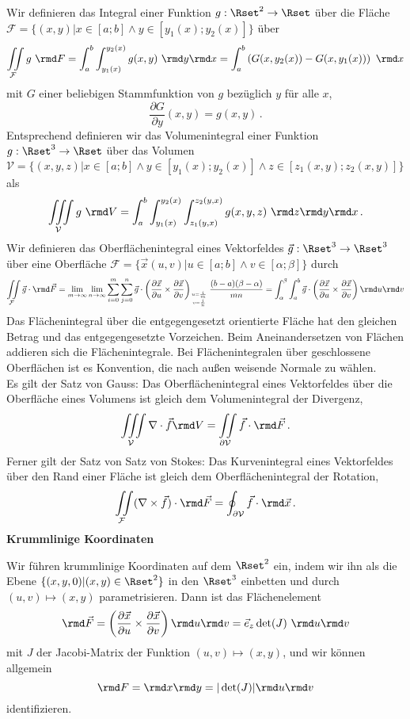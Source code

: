 \documentclass[a4paper,10pt]{article}
\begin{document}
Wir definieren das Integral einer Funktion $g:\Rset^2\to\Rset$ über die
Fläche\\ $\mathcal{F}=\{(x,y)|x\in[a;b]\wedge y\in[y_1(x);y_2(x)]\}$ über
\[
\iint\limits_{\mathcal{F}} g~\rmd F = \int_a^b\int_{y_1(x)}^{y_2(x)}g(x,y)~\rmd y\rmd x
= \int_a^b\left(G(x,y_2(x))-G(x,y_1(x))\right)~\rmd x
\]
mit $G$ einer beliebigen Stammfunktion von $g$ bezüglich $y$ für alle $x$,
\[
\frac{\partial G}{\partial y}(x,y)=g(x,y)\,.
\]
Entsprechend definieren wir das Volumenintegral einer Funktion
$g:\Rset^3\to\Rset$ über das Volumen
$\mathcal{V}=\{(x,y,z)|x\in[a;b]\wedge y\in[y_1(x);y_2(x)]\wedge z\in[z_1(x,y);z_2(x,y)]\}$ als
\[
\iiint\limits_{\mathcal{V}} g~\rmd V = \int_a^b\int_{y_1(x)}^{y_2(x)}\int_{z_1(y,x)}^{z_2(y,x)}g(x,y,z)~\rmd z\rmd y\rmd x\,.
\]
${}$\\
Wir definieren das Oberflächen\-integral eines Vektorfeldes
$\vec{g}:\Rset^3\to\Rset^3$ über eine Oberfläche
$\mathcal{F}=\{\vec{x}(u,v)|u\in[a;b]\wedge v\in[\alpha;\beta]\}$
durch
\[
\iint\limits_\mathcal{F} \vec{g}\cdot\rmd\vec{F}
= \lim\limits_{m\to\infty}\lim\limits_{n\to\infty}\sum_{i=0}^m\sum_{j=0}^n\vec{g}\cdot\left(\frac{\partial \vec{x}}{\partial u}\times\frac{\partial \vec{x}}{\partial v}\right)_{u=\frac{i}{m}\atop v=\frac{j}{n}}\frac{(b-a)(\beta-\alpha)}{mn}
= \int_\alpha^\beta\int_a^b \vec{g}\cdot\left(\frac{\partial \vec{x}}{\partial u}\times\frac{\partial \vec{x}}{\partial v}\right)\rmd u\rmd v
\]
Das Flächenintegral über die entgegengesetzt orientierte Fläche hat den gleichen Betrag und das entgegengesetzte Vorzeichen.
Beim Aneinandersetzen von Flächen addieren sich die Flächenintegrale.
Bei Flächenintegralen über geschlossene Oberflächen ist es Konvention, die nach außen weisende Normale zu wählen.\\

Es gilt der Satz von Gauss: Das Oberflächenintegral eines Vektorfeldes über die Oberfläche eines Volumens
ist gleich dem Volumenintegral der Divergenz,
\[
\iiint\limits_{\mathcal{V}}\nabla\cdot\vec{f}\rmd V = \iint\limits_{\partial\mathcal{V}}\vec{f}\cdot\rmd\vec{F}\,.
\]
Ferner gilt der Satz von Satz von Stokes:
Das Kurvenintegral eines Vektorfeldes über den Rand einer Fläche
ist gleich dem Oberflächenintegral der Rotation,
\[
\iint\limits_{\mathcal{F}}(\nabla\times\vec{f})\cdot\rmd\vec{F} = \oint_{\partial\mathcal{V}}\vec{f}\cdot\rmd\vec{x}\,.
\]
${}$\\

{\bf Krummlinige Koordinaten}

Wir führen krummlinige Koordinaten auf dem $\Rset^2$ ein, indem wir
ihn als die Ebene $\{(x,y,0)|(x,y)\in\Rset^2\}$ in den $\Rset^3$
einbetten und durch $(u,v)\mapsto (x,y)$ parametrisieren.
Dann ist das Flächenelement
\[
\rmd \vec{F} = \left(\frac{\partial\vec{x}}{\partial u}\times\frac{\partial\vec{x}}{\partial v}\right)\rmd u\rmd v = \vec{e}_z \det(J)~\rmd u\rmd v
\]
mit $J$ der Jacobi-Matrix der Funktion $(u,v)\mapsto(x,y)$,
und wir können allgemein
\[
\rmd F = \rmd x\rmd y = |\det(J)|\rmd u\rmd v
\]
identifizieren.
\end{document}
